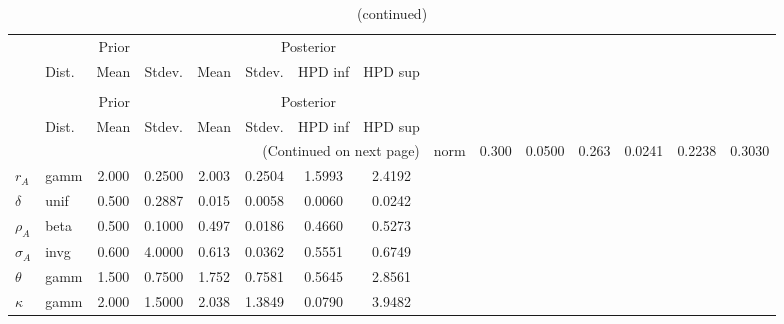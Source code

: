  
\begin{center}
\begin{longtable}{llcccccc} 
\caption{Results from Metropolis-Hastings (parameters)}
 \label{Table:MHPosterior:1}\\
\toprule 
  & \multicolumn{3}{c}{Prior}  &  \multicolumn{4}{c}{Posterior} \\
  \cmidrule(r{.75em}){2-4} \cmidrule(r{.75em}){5-8}
  & Dist. & Mean  & Stdev. & Mean & Stdev. & HPD inf & HPD sup\\
\midrule \endfirsthead 
\caption{(continued)}\\\toprule 
  & \multicolumn{3}{c}{Prior}  &  \multicolumn{4}{c}{Posterior} \\
  \cmidrule(r{.75em}){2-4} \cmidrule(r{.75em}){5-8}
  & Dist. & Mean  & Stdev. & Mean & Stdev. & HPD inf & HPD sup\\
\midrule \endhead 
\bottomrule \multicolumn{8}{r}{(Continued on next page)} \endfoot 
\bottomrule \endlastfoot 
${\alpha}$ & norm &   0.300 & 0.0500 &   0.263& 0.0241 &  0.2238 &  0.3030 \\ 
${r_{A}}$ & gamm &   2.000 & 0.2500 &   2.003& 0.2504 &  1.5993 &  2.4192 \\ 
${\delta}$ & unif &   0.500 & 0.2887 &   0.015& 0.0058 &  0.0060 &  0.0242 \\ 
${\rho_A}$ & beta &   0.500 & 0.1000 &   0.497& 0.0186 &  0.4660 &  0.5273 \\ 
${\sigma_A}$ & invg &   0.600 & 4.0000 &   0.613& 0.0362 &  0.5551 &  0.6749 \\ 
${\theta}$ & gamm &   1.500 & 0.7500 &   1.752& 0.7581 &  0.5645 &  2.8561 \\ 
${\kappa}$ & gamm &   2.000 & 1.5000 &   2.038& 1.3849 &  0.0790 &  3.9482 \\ 
\end{longtable}
 \end{center}
